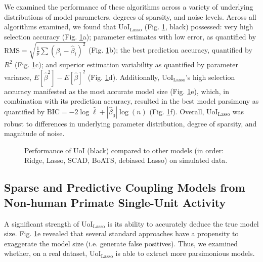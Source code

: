 \documentclass[letterpaper, 10 pt, conference]{ieeeconf}  %
\begin{document}
We examined the performance of these algorithms across a variety of underlying distributions of model parameters, degrees of sparsity, and noise levels. Across all algorithms examined, we found that UoI$_{\text{Lasso}}$ (Fig. \ref{fig:simulated}, black) possessed: very high selection accuracy (Fig. \ref{fig:simulated}a); parameter estimates with low error, as quantified by $\text{RMS}=\sqrt{\frac{1}{p} \sum(\beta_i -\hat{\beta}_i)^2}$ (Fig. \ref{fig:simulated}b); the best prediction accuracy, quantified by $R^2$ (Fig. \ref{fig:simulated}c); and superior estimation variability as quantified by parameter variance, $E[\hat{\beta}^2] - E[\hat{\beta}]^2$ (Fig. \ref{fig:simulated}d). Additionally, UoI$_{\text{Lasso}}$'s high selection accuracy manifested as the most accurate model size (Fig. \ref{fig:simulated}e), which, in combination with its prediction accuracy, resulted in the best model parsimony as quantified by $\text{BIC} = -2\log \hat{\ell} + |\hat{\beta}_0| \log(n)$ (Fig. \ref{fig:simulated}f). Overall, UoI$_{\text{Lasso}}$ was robust to differences in underlying parameter distribution, degree of sparsity, and magnitude of noise.
\begin{figure}[t]
    \centering
    \caption{Performance of UoI (black) compared to other models (in order: Ridge, Lasso, SCAD, BoATS, debiased Lasso) on simulated data.}
    \label{fig:simulated}
\end{figure}
\subsection{Sparse and Predictive Coupling Models from Non-human Primate Single-Unit Activity}
A significant strength of UoI$_{\text{Lasso}}$ is its ability to accurately deduce the true model size. Fig. \ref{fig:simulated}e revealed that several standard approaches have a propensity to exaggerate the model size (i.e. generate false positives). Thus, we examined whether, on a real dataset, UoI$_{\text{Lasso}}$ is able to extract more parsimonious models.
\end{document}

